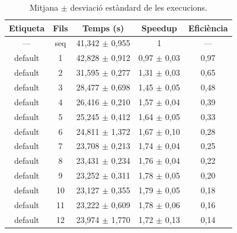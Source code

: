 \begin{table}[H]
\centering
\begin{tabular}{|c|c|c|c|c|}
\hline
\textbf{Etiqueta} & \textbf{Fils} & \textbf{Temps (s)} & \textbf{Speedup} & \textbf{Eficiència} \\ \hline
--- & seq & 41,342 $\pm$ 0,955 & 1 & --- \\ \hline
default & 1 & 42,828 $\pm$ 0,912 & 0,97 $\pm$ 0,03 & 0,97 \\ \hline
default & 2 & 31,595 $\pm$ 0,277 & 1,31 $\pm$ 0,03 & 0,65 \\ \hline
default & 3 & 28,477 $\pm$ 0,698 & 1,45 $\pm$ 0,05 & 0,48 \\ \hline
default & 4 & 26,416 $\pm$ 0,210 & 1,57 $\pm$ 0,04 & 0,39 \\ \hline
default & 5 & 25,245 $\pm$ 0,412 & 1,64 $\pm$ 0,05 & 0,33 \\ \hline
default & 6 & 24,811 $\pm$ 1,372 & 1,67 $\pm$ 0,10 & 0,28 \\ \hline
default & 7 & 23,708 $\pm$ 0,213 & 1,74 $\pm$ 0,04 & 0,25 \\ \hline
default & 8 & 23,431 $\pm$ 0,234 & 1,76 $\pm$ 0,04 & 0,22 \\ \hline
default & 9 & 23,252 $\pm$ 0,311 & 1,78 $\pm$ 0,05 & 0,20 \\ \hline
default & 10 & 23,127 $\pm$ 0,355 & 1,79 $\pm$ 0,05 & 0,18 \\ \hline
default & 11 & 23,222 $\pm$ 0,609 & 1,78 $\pm$ 0,06 & 0,16 \\ \hline
default & 12 & 23,974 $\pm$ 1,770 & 1,72 $\pm$ 0,13 & 0,14 \\ \hline
\end{tabular}
\caption{Mitjana $\pm$ desviació estàndard de les execucions.}
\label{tab:resultats}
\end{table}
